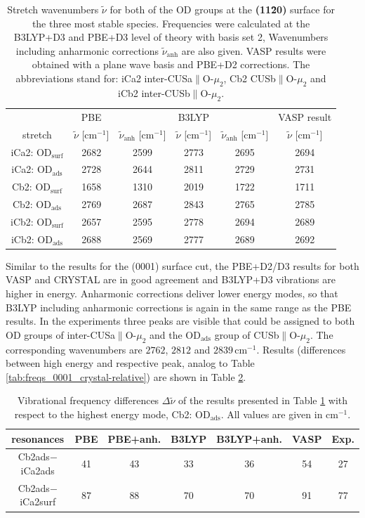 \documentclass[11pt,DIV=13,BCOR=5mm,a4paper,headinclude]{scrbook}
\begin{document}
\begin{table}[!h]
  \centering
  \caption{Stretch wavenumbers $\tilde{\nu}$ for both of the OD groups at the \textbf{(11\=20)} surface for the three most stable species.
Frequencies were calculated at the B3LYP+D3 and PBE+D3 level of theory with basis set 2, Wavenumbers including anharmonic corrections $\tilde{\nu}_\textrm{anh}$ are also given.
VASP results were obtained with a plane wave basis and PBE+D2 corrections.
The abbreviations stand for: iCa2 inter-CUSa$\parallel$O-$\mu_2$, Cb2 CUSb$\parallel$O-$\mu_2$ and iCb2 inter-CUSb$\parallel$O-$\mu_2$.}
  \begin{tabular}{ccc|cc|c}
  \toprule
   & PBE& & B3LYP & &VASP result\\
  stretch & $\tilde{\nu}$ [cm$^{-1}$] &$\tilde{\nu}_\textrm{anh}$ [cm$^{-1}$] &$\tilde{\nu}$ [cm$^{-1}$] & $\tilde{\nu}_\textrm{anh}$ [cm$^{-1}$]&$\tilde{\nu}$ [cm$^{-1}$]\\\midrule
  iCa2: OD$_{\textrm{surf}}$ &2682 &2599 &2773 &2695 & 2694\\
  iCa2: OD$_{\textrm{ads}}$  &2728 &2644 &2811 &2729 & 2731\\
  Cb2: OD$_{\textrm{surf}}$  &1658 &1310 &2019 &1722 & 1711\\
  Cb2: OD$_{\textrm{ads}}$   &2769 &2687 &2843 &2765 & 2785\\
  iCb2: OD$_{\textrm{surf}}$ &2657 &2595 &2778 &2694 & 2689\\
  iCb2: OD$_{\textrm{ads}}$  &2688 &2569 &2777 &2689 & 2692\\\bottomrule
  \end{tabular}
  \label{tab:freqs_11-20_crystal}
\end{table}
Similar to the results for the (0001) surface cut, the PBE+D2/D3 results for both VASP and CRYSTAL are in good agreement and B3LYP+D3 vibrations are higher in energy.
Anharmonic corrections deliver lower energy modes, so that B3LYP including anharmonic corrections is again in the same range as the PBE results.
In the experiments \cite{Heiden11-20_2018} three peaks are visible that could be assigned to both OD groups of inter-CUSa$\parallel$O-$\mu_2$ and the OD$_\textrm{ads}$ group of CUSb$\parallel$O-$\mu_2$.
The corresponding wavenumbers are $2762$, $2812$ and $2839\,$cm$^{-1}$.
Results (differences between high energy and respective peak, analog to Table \ref{tab:freqs_0001_crystal-relative}) are shown in Table \ref{tab:freqs_11-20_crystal-relative}.
\begin{table}[!h]
  \centering
  \caption{Vibrational frequency differences $\Delta \tilde{\nu}$ of the results presented in Table \ref{tab:freqs_11-20_crystal} with respect to the highest energy mode, Cb2: OD$_\textrm{ads}$.
All values are given in cm$^{-1}$.}
  \begin{tabular}{c|cc|cc|c|c}
  \toprule
   resonances& PBE & PBE+anh. & B3LYP & B3LYP+anh. &VASP&Exp.\\\midrule
  Cb2ads$-$iCa2ads  &41 &43 &33 &36 &54 &27 \\
  Cb2ads$-$iCa2surf &87 &88 &70 &70 &91 &77 \\\bottomrule
    \end{tabular}
  \label{tab:freqs_11-20_crystal-relative}
\end{table}
\end{document}
